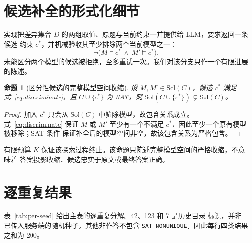 \documentclass[letterpaper]{article}
\newcommand{\Sol}{\mathrm{Sol}}
\newtheorem{proposition}{命题}
\begin{document}
\section{候选补全的形式化细节}
\label{app:completion}

实现把差异集合 $D$ 的两组取值、原题与当前约束一并提供给 LLM，要求返回一条候选
约束 $c^{*}$，并机械验收其至少排除两个当前模型之一：
\begin{equation}
  \lnot\bigl(M\models c^{*}\ \wedge\ M'\models c^{*}\bigr).
  \label{eq:discriminate}
\end{equation}
未能区分两个模型的候选被拒绝，至多重试一次。我们对该分支只作一个有限进展的陈述。

\begin{proposition}[区分性候选的完整模型空间收缩]
\label{prop:full-model-contraction}
设 $M,M'\in\Sol(C)$，候选 $c^{*}$ 满足式~\eqref{eq:discriminate}，且
$C\cup\{c^{*}\}$ 为 SAT，则
$\Sol(C\cup\{c^{*}\})\subsetneq\Sol(C)$。
\end{proposition}
\begin{proof}
加入 $c^{*}$ 只会从 $\Sol(C)$ 中筛除模型，故包含关系成立。式~\eqref{eq:discriminate}
保证 $M$ 或 $M'$ 至少有一个不满足 $c^{*}$，因此至少一个原有模型被移除；SAT 条件
保证补全后的模型空间非空，故该包含关系为严格包含。
\end{proof}

有限预算 $K$ 保证该探索过程终止。该命题只陈述完整模型空间的严格收缩，不意味着
答案投影收缩、候选忠实于原文或最终答案正确。

\section{逐重复结果}
\label{app:accounting}

表~\ref{tab:per-seed} 给出主表的逐重复分解。42、123 和 7 是历史目录
标识，并非已传入服务端的随机种子。其他非作答不包含
\texttt{SAT\_NONUNIQUE}，因此每行四类结果之和为 200。
\end{document}
